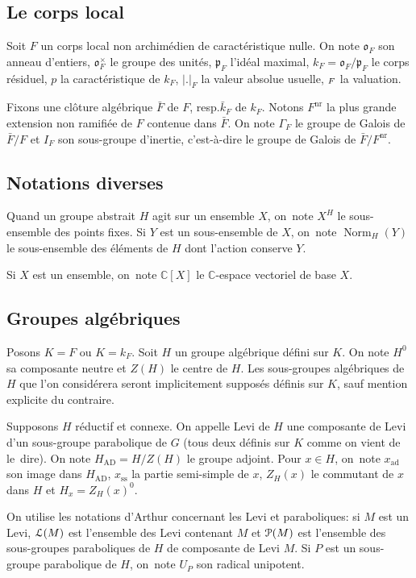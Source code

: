 \documentclass[11pt]{article}
\newcommand{\resp}{resp.\xspace}
\numberwithin{equation}{section}\providecommand{\og}{«\,}\providecommand{\fg}{\,»}
\let\mathcal \EuScript
\newcommand{\NoChangel}[1]{%
\expandafter\let\csname old\string#1\endcsname=#1
\let#1=\relax
\newcommand{#1}{\mathcode`l="716C\csname old\string#1\endcsname\mathcode`l="7160 }%
}
\newcommand{\fro}{\mathfrak{o}}
\newcommand{\frp}{\mathfrak{p}}
\newcommand{\AD}{\mathrm{AD}}
\newcommand{\nr}{\mathrm{nr}}
\newcommand{\rss}{\mathrm{ss}}
\DeclareMathOperator{\ad}{ad}
\DeclareMathOperator{\Norm}{Norm}
\DeclareMathOperator{\val}{val} \NoChangel{\val}
\newcommand{\cL}{\mathcal{L}}
\newcommand{\cP}{\mathcal{P}}
\newcommand{\CC}{\mathbb{C}}
\theoremstyle{plain}
\theoremstyle{definition}
\begin{document}
\subsection{Le corps local}

Soit $F$ un corps local non archimédien de caractéristique nulle. On note $\fro_{F}$ son anneau d'entiers, $\fro_{F}^{\times}$ le groupe des unités, $ \frp_{F}$ l'idéal maximal, $k_{F}=\fro_{F}/\frp_{F}$ le corps résiduel, $p$ la caractéristique de $k_{F}$, $\vert .\vert _{F}$ la valeur absolue usuelle, $\val_{F}$ la valuation.

Fixons une clôture algébrique $\bar{F}$ de $F$, \resp $\bar{k}_{F}$ de $k_{F}$. Notons $F^{\nr}$ la plus grande extension non ramifiée de $F$ contenue dans $\bar{F}$. On note $\Gamma_{F}$ le groupe de Galois de $\bar{F}/ F$ et $I_{F}$ son sous-groupe d'inertie, c'est-à-dire le groupe de Galois de $\bar{F}/F^{\nr}$.

\subsection{Notations diverses}

Quand un groupe abstrait $H$ agit sur un ensemble $X$, on~note $X^{H}$ le sous-ensemble des points fixes. Si $Y$ est un sous-ensemble de $X$, on~note $\Norm_{H}(Y)$ le sous-ensemble des éléments de $H$ dont l'action conserve $Y$.

Si $X$ est un ensemble, on~note $\CC[X]$ le $\CC$-espace vectoriel de base $X$.

\subsection{Groupes algébriques}\label{groupesalgebriques}

Posons $K=F$ ou $K=k_{F}$. Soit $H$ un groupe algébrique défini sur $K$. On note $H^0$ sa composante neutre et $Z(H)$ le centre de $H$. Les sous-groupes algébriques de $H$ que l'on considérera seront implicitement supposés définis sur $K$, sauf mention explicite du contraire.

Supposons $H$ réductif et connexe. On appelle Levi de $H$ une composante de Levi d'un sous-groupe parabolique de $G$ (tous deux définis sur $K$ comme on vient de le~dire). On note $H_{\AD}=H/Z(H)$ le groupe adjoint. Pour $x\in H$, on~note $x_{\ad}$ son image dans $H_{\AD}$, $x_{\rss}$ la partie semi-simple de $x$, $Z_{H}(x)$ le commutant de $x$ dans $H$ et $H_{x}=Z_{H}(x)^0$.

On utilise les notations d'Arthur concernant les Levi et paraboliques: si $M$ est un Levi, $\cL(M)$ est l'ensemble des Levi contenant $M$ et $\cP(M)$ est l'ensemble des sous-groupes paraboliques de $H$ de composante de Levi $M$. Si $P$ est un sous-groupe parabolique de $H$, on~note $U_{P}$ son radical unipotent.
\end{document}
